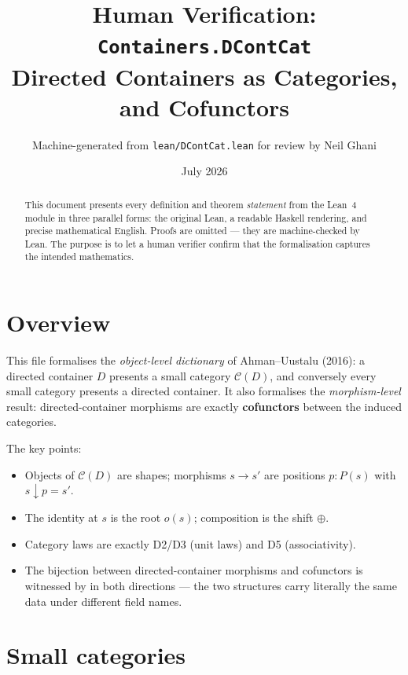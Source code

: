 \documentclass[11pt,a4paper]{article}
\title{Human Verification: \texttt{Containers.DContCat}\\[4pt]
  \large Directed Containers as Categories, and Cofunctors}
\author{Machine-generated from \texttt{lean/DContCat.lean} for review by Neil Ghani}
\date{July 2026}
\begin{document}
\maketitle

\begin{abstract}
This document presents every definition and theorem \emph{statement} from the
Lean~4 module  in three parallel forms: the original
Lean, a readable Haskell rendering, and precise mathematical English.  Proofs
are omitted --- they are machine-checked by Lean.  The purpose is to let a
human verifier confirm that the formalisation captures the intended
mathematics.
\end{abstract}

\tableofcontents
\bigskip

\section{Overview}

This file formalises the \emph{object-level dictionary} of Ahman--Uustalu
(2016): a directed container $D$ presents a small category $\mathcal{C}(D)$,
and conversely every small category presents a directed container.  It also
formalises the \emph{morphism-level} result: directed-container morphisms are
exactly \textbf{cofunctors} between the induced categories.

The key points:
\begin{itemize}
  \item Objects of $\mathcal{C}(D)$ are shapes; morphisms $s \to s'$ are
        positions $p : P(s)$ with $s \downarrow p = s'$.
  \item The identity at $s$ is the root $o(s)$; composition is the shift
        $\oplus$.
  \item Category laws are exactly D2/D3 (unit laws) and D5 (associativity).
  \item The bijection between directed-container morphisms and cofunctors is
        witnessed by  in both directions --- the two structures carry
        literally the same data under different field names.
\end{itemize}

\section{Small categories}
\end{document}
